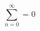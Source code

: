 \documentclass{article}
\begin{document}
\begin{equation} \sum_{n=0}^{\infty} = 0 \end{equation}
\end{document}
